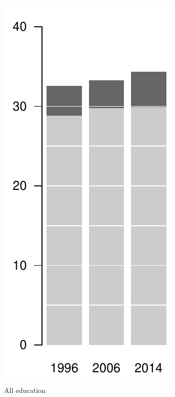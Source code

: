 \begin{figure}[ht!]
    \centering
    \begin{subfigure}[b]{0.2\textwidth}
        \includegraphics[scale=.5]{Figures/bar_fem_all.pdf}
        \caption{All education}
        \label{fig:barsfemalesa}
    \end{subfigure}
    ~ %
    \begin{subfigure}[b]{0.2\textwidth}

\end{subfigure}
\end{figure}
